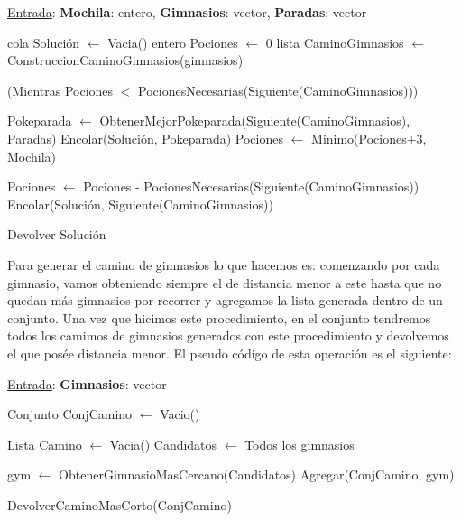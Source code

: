 \begin{algorithm}[H]
\label{}
\caption{}
\begin{algorithmic}[1]
\Statex \underline{Entrada}: \textbf{Mochila}: entero, \textbf{Gimnasios}: vector, \textbf{Paradas}: vector

\State cola Solución $\leftarrow$ Vacia()
\State entero Pociones $\leftarrow$ 0
\State lista CaminoGimnasios $\leftarrow$ ConstruccionCaminoGimnasios(gimnasios)


	\While(Mientras Pociones $<$ PocionesNecesarias(Siguiente(CaminoGimnasios)))

		\State Pokeparada $\leftarrow$ ObtenerMejorPokeparada(Siguiente(CaminoGimnasios), Paradas)
		\State Encolar(Solución, Pokeparada)
		\State Pociones $\leftarrow$ Minimo(Pociones+3, Mochila)

	\EndWhile

	\State Pociones $\leftarrow$ Pociones - PocionesNecesarias(Siguiente(CaminoGimnasios))
	Encolar(Solución, Siguiente(CaminoGimnasios))

\EndWhile

\State Devolver Solución

\medskip
\Statex \underline{}
\end{algorithmic}
\end{algorithm}

Para generar el camino de gimnasios lo que hacemos es: comenzando por cada gimnasio, vamos obteniendo siempre el de distancia menor a este hasta que no quedan más gimnasios por recorrer y agregamos la lista generada dentro de un conjunto. Una vez que hicimos este procedimiento, en el conjunto tendremos todos los camimos de gimnasios generados con este procedimiento y devolvemos el que posée distancia menor. El pseudo código de esta operación es el siguiente:

\begin{algorithm}[H]
\begin{algorithmic}
\Statex \underline{Entrada}: \textbf{Gimnasios}: vector

\State Conjunto ConjCamino $\leftarrow$ Vacio()


	\State Lista Camino $\leftarrow$ Vacia()
	\State Candidatos $\leftarrow$ Todos los gimnasios

		\State gym $\leftarrow$ ObtenerGimnasioMasCercano(Candidatos)
		Agregar(ConjCamino, gym)

	\EndWhile

\EndFor

\State DevolverCaminoMasCorto(ConjCamino)

\medskip
\Statex \underline{}
\end{algorithmic}
\end{algorithm}


